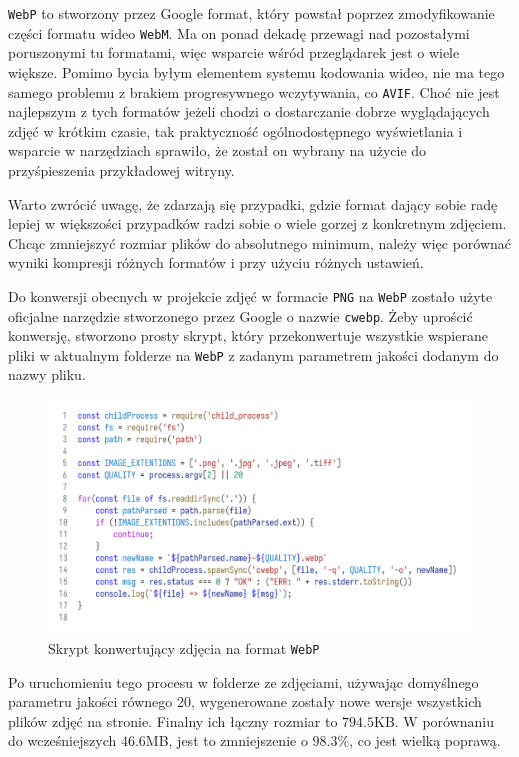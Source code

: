 \documentclass[licencjacka]{pracadypl}
\begin{document}
\texttt{WebP} to stworzony przez Google format, który powstał poprzez zmodyfikowanie części formatu wideo \texttt{WebM}. Ma on ponad dekadę przewagi nad pozostałymi poruszonymi tu formatami, więc wsparcie wśród przeglądarek jest o wiele większe. Pomimo bycia byłym elementem systemu kodowania wideo, nie ma tego samego problemu z brakiem progresywnego wczytywania, co \texttt{AVIF}. Choć nie jest najlepszym z tych formatów jeżeli chodzi o dostarczanie dobrze wyglądających zdjęć w krótkim czasie, tak praktyczność ogólnodostępnego wyświetlania i wsparcie w narzędziach sprawiło, że został on wybrany na użycie do przyśpieszenia przykładowej witryny.

Warto zwrócić uwagę, że zdarzają się przypadki, gdzie format dający sobie radę lepiej w większości przypadków radzi sobie o wiele gorzej z konkretnym zdjęciem. Chcąc zmniejszyć rozmiar plików do absolutnego minimum, należy więc porównać wyniki kompresji różnych formatów i przy użyciu różnych ustawień.

Do konwersji obecnych w projekcie zdjęć w formacie \texttt{PNG} na \texttt{WebP} zostało użyte oficjalne narzędzie stworzonego przez Google o nazwie \texttt{cwebp}. Żeby uprościć konwersję, stworzono prosty skrypt, który przekonwertuje wszystkie wspierane pliki w aktualnym folderze na \texttt{WebP} z zadanym parametrem jakości dodanym do nazwy pliku.

\begin{figure}[H]
  \centering
  \includegraphics[width=\linewidth/\real{1.1}]{images/code_script_conv_webm.png}
  \caption{Skrypt konwertujący zdjęcia na format \texttt{WebP}}
  \label{fig:script-webp}
\end{figure}

Po uruchomieniu tego procesu w folderze ze zdjęciami, używając domyślnego parametru jakości równego 20, wygenerowane zostały nowe wersje wszystkich plików zdjęć na stronie. Finalny ich łączny rozmiar to $794.5$KB. W porównaniu do wcześniejszych $46.6$MB, jest to zmniejszenie o $98.3\%$, co jest wielką poprawą.
\end{document}
